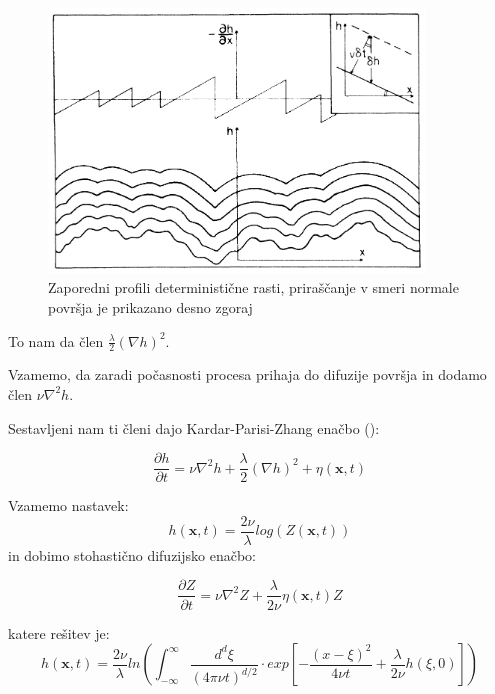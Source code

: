 \documentclass[a4paper, oneside, 12pt]{book}
\begin{document}
            \begin{figure}[H]
              \begin{center}
                \includegraphics[width=10cm]{slike/kpz}
              \end{center}
              \caption{Zaporedni profili deterministične rasti, priraščanje v smeri normale površja je prikazano desno zgoraj}
              \label{fig:kpz}
            \end{figure}

            To nam da člen $\frac{\lambda}{2} (\nabla h)^2$.

            Vzamemo, da zaradi počasnosti procesa prihaja do difuzije površja in dodamo člen $\nu \nabla^2 h$.

            Sestavljeni nam ti členi dajo Kardar-Parisi-Zhang enačbo (\cite{kardar1986dynamic}):

            \begin{equation}
              \frac{\partial h}{\partial t} = \nu \nabla^2 h + \frac{\lambda}{2} (\nabla h)^2 + \eta (\mathbf{x},t)
              \label{KPZ}
            \end{equation}

            Vzamemo nastavek:
        \begin{equation}
            h(\mathbf{x},t) = \frac{2 \nu}{\lambda} log(Z(\mathbf{x},t))
        \end{equation}
            in dobimo stohastično difuzijsko enačbo:

        \begin{equation}
            \frac{\partial Z}{\partial t} = \nu \nabla^2 Z + \frac{\lambda}{2 \nu} \eta(\mathbf{x},t) Z
        \end{equation}

        katere rešitev je:
        \begin{equation}
            h(\mathbf{x},t) = \frac{2 \nu}{\lambda} ln \left( \int_{-\infty}^{\infty} \frac{d^d \xi}{(4 \pi \nu t)^{d/2}} \cdot exp \left[-\frac{(x-\xi)^2}{4 \nu t} + \frac{\lambda}{2 \nu}h(\xi,0) \right] \right)
        \end{equation}
\end{document}
